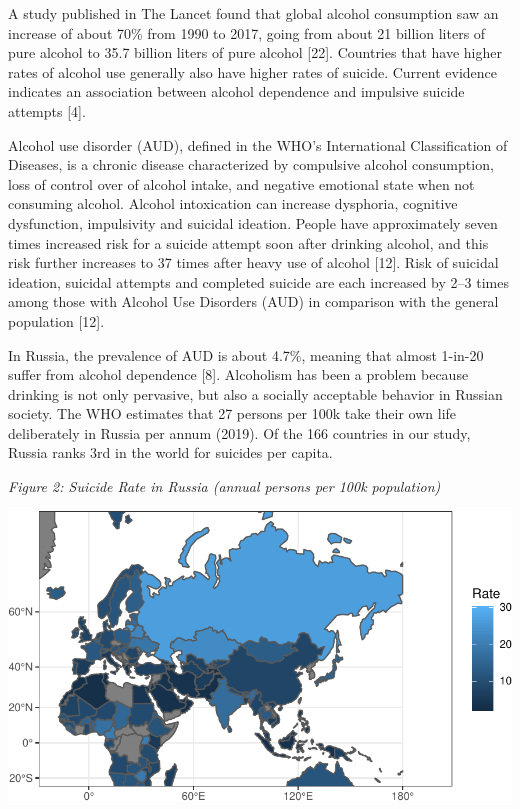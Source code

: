 \documentclass[]{article}
\begin{document}
A study published in The Lancet found that global alcohol consumption
saw an increase of about 70\% from 1990 to 2017, going from about 21
billion liters of pure alcohol to 35.7 billion liters of pure alcohol
{[}22{]}. Countries that have higher rates of alcohol use generally also
have higher rates of suicide. Current evidence indicates an association
between alcohol dependence and impulsive suicide attempts {[}4{]}.

Alcohol use disorder (AUD), defined in the WHO's International
Classification of Diseases, is a chronic disease characterized by
compulsive alcohol consumption, loss of control over of alcohol intake,
and negative emotional state when not consuming alcohol. Alcohol
intoxication can increase dysphoria, cognitive dysfunction, impulsivity
and suicidal ideation. People have approximately seven times increased
risk for a suicide attempt soon after drinking alcohol, and this risk
further increases to 37 times after heavy use of alcohol {[}12{]}. Risk
of suicidal ideation, suicidal attempts and completed suicide are each
increased by 2--3 times among those with Alcohol Use Disorders (AUD) in
comparison with the general population {[}12{]}.

In Russia, the prevalence of AUD is about 4.7\%, meaning that almost
1-in-20 suffer from alcohol dependence {[}8{]}. Alcoholism has been a
problem because drinking is not only pervasive, but also a socially
acceptable behavior in Russian society. The WHO estimates that 27
persons per 100k take their own life deliberately in Russia per annum
(2019). Of the 166 countries in our study, Russia ranks 3rd in the world
for suicides per capita.

\emph{Figure 2: Suicide Rate in Russia (annual persons per 100k
population)}

\begin{center}\includegraphics{Project_Report_files/figure-latex/russia_map_plot-1} \end{center}
\end{document}
